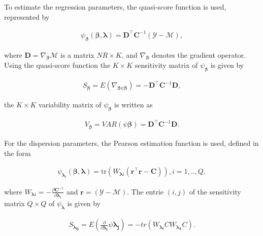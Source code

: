 \documentclass[AMA,STIX1COL]{WileyNJD-v2}
\begin{document}
To estimate the regression parameters, the quasi-score function \cite{Liang86} is used, represented by

$$
\begin{aligned}
  \psi_{\boldsymbol{\beta}}(\boldsymbol{\beta},
  \boldsymbol{\lambda}) = \boldsymbol{D}^\top
  \boldsymbol{C}^{-1}(\mathcal{Y} - \mathcal{M}),
\end{aligned}
$$

\noindent where $\boldsymbol{D} = \nabla_{\boldsymbol{\beta}} \mathcal{M}$ is a matrix $NR \times K$, and $\nabla_{\boldsymbol{\beta}}$ denotes the gradient operator. Using the quasi-score function the $K \times K$ sensitivity matrix of $\psi_{\boldsymbol{\beta}}$ is given by

$$
\begin{aligned}
S_{\boldsymbol{\beta}} = E(\nabla_{\boldsymbol{\beta} \psi \boldsymbol{\beta}}) = -\boldsymbol{D}^{\top} \boldsymbol{C}^{-1} \boldsymbol{D},
\end{aligned}
$$

\noindent the $K \times K$ variability matrix of $\psi_{\boldsymbol{\beta}}$ is written as

$$
\begin{aligned}
V_{\boldsymbol{\beta}} = VAR(\psi \boldsymbol{\beta}) = \boldsymbol{D}^{\top} \boldsymbol{C}^{-1} \boldsymbol{D}.
\end{aligned}
$$

For the dispersion parameters, the Pearson estimation function is used, defined in the form

$$
  \begin{aligned}
    \psi_{\boldsymbol{\lambda}_i}(\boldsymbol{\beta},
    \boldsymbol{\lambda}) =
    \mathrm{tr}(W_{\boldsymbol{\lambda}i}
    (\boldsymbol{r}^\top\boldsymbol{r} -
    \boldsymbol{C})),  i = 1,.., Q, 
  \end{aligned}
$$

\noindent where $W_{\boldsymbol{\lambda}i} = -\frac{\partial \boldsymbol{C}^{-1}}{\partial \boldsymbol{\lambda}_i}$ and $\boldsymbol{ r} = (\mathcal{Y} - \mathcal{M})$. The entrie $(i,j)$ of the sensitivity matrix $Q \times Q$ of $\psi_{\boldsymbol{\lambda}}$ is given by

$$
  \begin{aligned}
    S_{\boldsymbol{\lambda_{ij}}} = E \left (\frac{\partial }{\partial \boldsymbol{\lambda_{i}}} \psi \boldsymbol{\lambda_{j}}\right) = -tr(W_{\boldsymbol{\lambda_{i}}} CW_{\boldsymbol{\lambda_{J}}} C).
  \end{aligned}
$$
\end{document}
